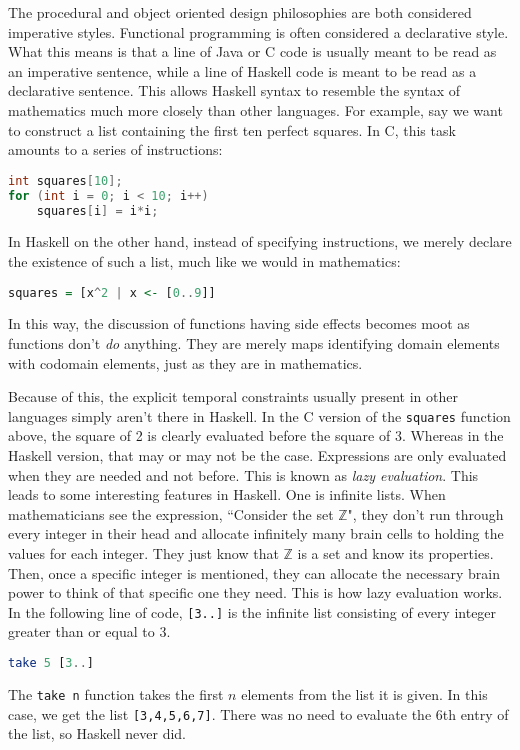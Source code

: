\documentclass[MS, xcolor=dvipsnames]{wfuthesis}
\def\bZ{\mathbb{Z}}
\theoremstyle{definition}
\begin{document}
The procedural and object oriented design philosophies are both considered imperative styles. Functional programming is often considered a declarative style. What this means is that a line of Java or C code is usually meant to be read as an imperative sentence, while a line of Haskell code is meant to be read as a declarative sentence. This allows Haskell syntax to resemble the syntax of mathematics much more closely than other languages. For example, say we want to construct a list containing the first ten perfect squares. In C, this task amounts to a series of instructions:
\begin{lstlisting}[language=C]
int squares[10];
for (int i = 0; i < 10; i++)
    squares[i] = i*i;
\end{lstlisting}
In Haskell on the other hand, instead of specifying instructions, we merely declare the existence of such a list, much like we would in mathematics:
\begin{lstlisting}[language=Haskell]
squares = [x^2 | x <- [0..9]]
\end{lstlisting}
In this way, the discussion of functions having side effects becomes moot as functions don't \emph{do} anything. They are merely maps identifying domain elements with codomain elements, just as they are in mathematics. \par 
Because of this, the explicit temporal constraints usually present in other languages simply aren't there in Haskell. In the C version of the \lstinline{squares} function above, the square of 2 is clearly evaluated before the square of 3. Whereas in the Haskell version, that may or may not be the case. Expressions are only evaluated when they are needed and not before. This is known as \emph{lazy evaluation}. This leads to some interesting features in Haskell. One is infinite lists. When mathematicians see the expression, ``Consider the set $\bZ$", they don't run through every integer in their head and allocate infinitely many brain cells to holding the values for each integer. They just know that $\bZ$ is a set and know its properties. Then, once a specific integer is mentioned, they can allocate the necessary brain power to think of that specific one they need. This is how lazy evaluation works. In the following line of code, \lstinline{[3..]} is the infinite list consisting of every integer greater than or equal to 3.
\begin{lstlisting}[language=Haskell]
take 5 [3..]
\end{lstlisting}
The \lstinline{take n} function takes the first $n$ elements from the list it is given. In this case, we get the list \lstinline{[3,4,5,6,7]}. There was no need to evaluate the 6th entry of the list, so Haskell never did. \par 
\end{document}
